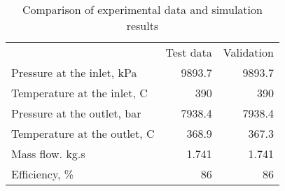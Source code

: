 \begin{table}
\caption{Comparison of experimental data and simulation results}
\begin{center}
\begin{tabulary}{0.9\textwidth}{LRR}
& Test data & Validation \\
Pressure at the inlet, kPa & 9893.7 & 9893.7 \\
Temperature at the inlet, C & 390 & 390 \\
Pressure at the outlet, bar & 7938.4 & 7938.4 \\
Temperature at the outlet, C & 368.9 & 367.3 \\
Mass flow. kg.s & 1.741 & 1.741 \\
Efficiency, \% & 86 & 86 \\
\end{tabulary}
\end{center}
\end{table}